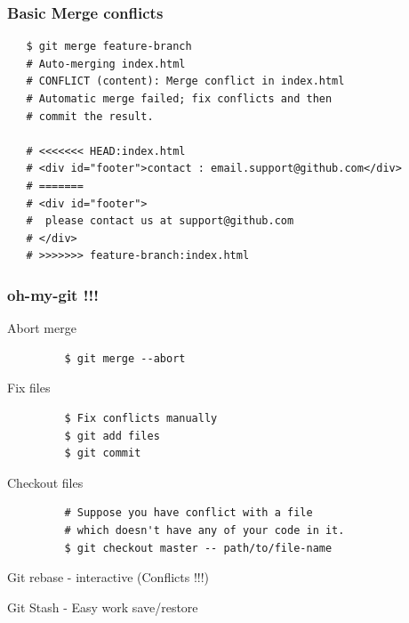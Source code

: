\documentclass[10pt]{beamer}
\begin{document}
\begin{frame}[fragile]
  \frametitle{Basic Merge conflicts}
   \begin{verbatim}
   $ git merge feature-branch
   # Auto-merging index.html
   # CONFLICT (content): Merge conflict in index.html
   # Automatic merge failed; fix conflicts and then
   # commit the result.

   # <<<<<<< HEAD:index.html
   # <div id="footer">contact : email.support@github.com</div>
   # =======
   # <div id="footer">
   #  please contact us at support@github.com
   # </div>
   # >>>>>>> feature-branch:index.html
   \end{verbatim}
\end{frame}

\begin{frame}[fragile]
  \frametitle{oh-my-git !!!}
    \begin{block}{Abort merge}
      \begin{verbatim}
         $ git merge --abort
    \end{verbatim}
    \end{block}
    \pause
    \begin{block}{Fix files}
      \begin{verbatim}
         $ Fix conflicts manually
         $ git add files
         $ git commit
    \end{verbatim}
    \end{block}
     \pause
    \begin{block}{Checkout files}
      \begin{verbatim}
         # Suppose you have conflict with a file
         # which doesn't have any of your code in it.
         $ git checkout master -- path/to/file-name
    \end{verbatim}
    \end{block}
\end{frame}

\begin{frame}
  \begin{center}
    \Huge{Git rebase - interactive (Conflicts !!!)}
  \end{center}
\end{frame}

\begin{frame}
  \begin{center}
    \Huge{Git Stash - Easy work save/restore }
  \end{center}
\end{frame}
\end{document}
